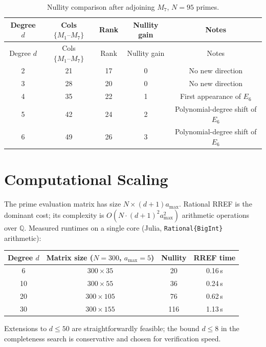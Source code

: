 \documentclass[11pt]{article}
\newcommand{\Q}{\mathbb{Q}}
\begin{document}
\begin{longtable}{@{}ccccc@{}}
\caption{Nullity comparison after adjoining $M_7$, $N=95$ primes.}
\label{tab:expanded-m7}\\
\toprule
Degree $d$ & Cols $\{M_1\text{--}M_7\}$ & Rank & Nullity gain & Notes \\
\midrule
\endfirsthead
\toprule
Degree $d$ & Cols $\{M_1\text{--}M_7\}$ & Rank & Nullity gain & Notes \\
\midrule
\endhead
2 & 21 & 17 & 0 & No new direction \\
3 & 28 & 20 & 0 & No new direction \\
4 & 35 & 22 & 1 & First appearance of $E_6$ \\
5 & 42 & 24 & 2 & Polynomial-degree shift of $E_6$ \\
6 & 49 & 26 & 3 & Polynomial-degree shift of $E_6$ \\
\bottomrule
\end{longtable}

\section{Computational Scaling}
\label{app:scaling}

The prime evaluation matrix has size $N\times(d+1)a_{\max}$.
Rational RREF is the dominant cost; its complexity is
$O\!\left(N\cdot(d+1)^2a_{\max}^2\right)$ arithmetic operations over $\Q$.
Measured runtimes on a single core (Julia, \texttt{Rational\{BigInt\}} arithmetic):

\begin{table}[H]
\centering
\begin{tabular}{@{}cccc@{}}
\toprule
Degree $d$ & Matrix size ($N=300$, $a_{\max}=5$) & Nullity & RREF time \\
\midrule
6  & $300\times 35$  & 20 & 0.16\,s \\
10 & $300\times 55$  & 36 & 0.24\,s \\
20 & $300\times 105$ & 76 & 0.62\,s \\
30 & $300\times 155$ & 116 & 1.13\,s \\
\bottomrule
\end{tabular}
\end{table}

Extensions to $d\le 50$ are straightforwardly feasible; the bound $d\le 8$ in the
completeness search is conservative and chosen for verification speed.
\end{document}
